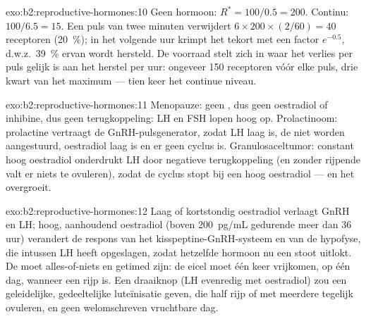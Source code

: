 \begin{solution}{exo:b2:reproductive-hormones:10}
Geen hormoon: $R^* = 100/0.5 = 200$. Continu: $100/6.5 = 15$. Een
puls van twee minuten verwijdert $6\times 200\times(2/60) = 40$ receptoren
(\qty{20}{\%}); in het volgende uur krimpt het tekort met een factor
$e^{-0.5}$, d.w.z.\ \qty{39}{\%} ervan wordt hersteld. De voorraad stelt
zich in waar het verlies per puls gelijk is aan het herstel per uur:
ongeveer 150 receptoren vóór elke puls, drie kwart van het maximum ---
tien keer het continue niveau.
\end{solution}

\begin{solution}{exo:b2:reproductive-hormones:11}
Menopauze: geen , dus geen oestradiol of inhibine, dus geen
terugkoppeling: LH en FSH lopen hoog op. Prolactinoom: prolactine
vertraagt de GnRH-pulsgenerator, zodat LH laag is, de  niet worden
aangestuurd, oestradiol laag is en er geen cyclus is. Granulosaceltumor:
constant hoog oestradiol onderdrukt LH door negatieve terugkoppeling (en
zonder rijpende  valt er niets te ovuleren), zodat de cyclus
stopt bij een hoog oestradiol --- en het  overgroeit.
\end{solution}

\begin{solution}{exo:b2:reproductive-hormones:12}
Laag of kortstondig oestradiol verlaagt GnRH en LH; hoog, aanhoudend
oestradiol (boven \qty{200}{pg/mL} gedurende meer dan 36 uur) verandert de
respons van het kisspeptine-GnRH-systeem en van de hypofyse, die intussen
LH heeft opgeslagen, zodat hetzelfde hormoon nu een stoot uitlokt. De
 moet alles-of-niets en getimed zijn: de eicel moet één keer
vrijkomen, op één dag, wanneer een  rijp is. Een draaiknop (LH
evenredig met oestradiol) zou een geleidelijke, gedeeltelijke luteïnisatie
geven,  die half rijp of met meerdere tegelijk ovuleren, en geen
welomschreven vruchtbare dag.
\end{solution}

